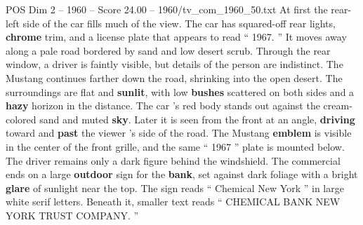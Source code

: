 \begin{textsample}{POS Dim 2 – 1960 – Score 24.00 – 1960/tv\_com\_1960\_50.txt}
At first the rear-left side of the car fills much of the view.
The car has squared-off rear lights, \textbf{chrome} trim, and a license plate that appears to read “ 1967. ” It moves away along a pale road bordered by sand and low desert scrub.
Through the rear window, a driver is faintly visible, but details of the person are indistinct.
The Mustang continues farther down the road, shrinking into the open desert.
The surroundings are flat and \textbf{sunlit}, with low \textbf{bushes} scattered on both sides and a \textbf{hazy} horizon in the distance.
The car ’s red body stands out against the cream-colored sand and muted \textbf{sky}.
Later it is seen from the front at an angle, \textbf{driving} toward and \textbf{past} the viewer ’s side of the road.
The Mustang \textbf{emblem} is visible in the center of the front grille, and the same “ 1967 ” plate is mounted below.
The driver remains only a dark figure behind the windshield.
The commercial ends on a large \textbf{outdoor} sign for the \textbf{bank}, set against dark foliage with a bright \textbf{glare} of sunlight near the top.
The sign reads “ Chemical New York ” in large white serif letters.
Beneath it, smaller text reads “ CHEMICAL BANK NEW YORK TRUST COMPANY. ”

\end{textsample}
